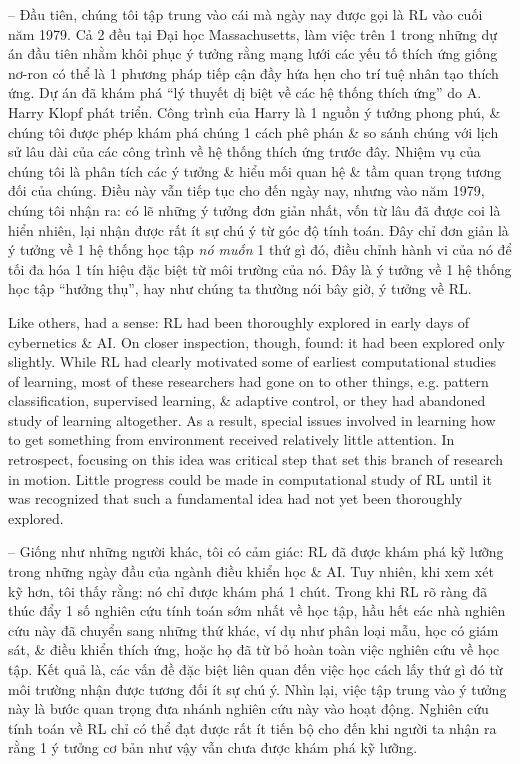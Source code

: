 \documentclass{article}
\begin{document}
\begin{itemize}
    -- Đầu tiên, chúng tôi tập trung vào cái mà ngày nay được gọi là RL vào cuối năm 1979. Cả 2 đều tại Đại học Massachusetts, làm việc trên 1 trong những dự án đầu tiên nhằm khôi phục ý tưởng rằng mạng lưới các yếu tố thích ứng giống nơ-ron có thể là 1 phương pháp tiếp cận đầy hứa hẹn cho trí tuệ nhân tạo thích ứng. Dự án đã khám phá ``lý thuyết dị biệt về các hệ thống thích ứng'' do {\sc A. Harry Klopf} phát triển. Công trình của Harry là 1 nguồn ý tưởng phong phú, \& chúng tôi được phép khám phá chúng 1 cách phê phán \& so sánh chúng với lịch sử lâu dài của các công trình về hệ thống thích ứng trước đây. Nhiệm vụ của chúng tôi là phân tích các ý tưởng \& hiểu mối quan hệ \& tầm quan trọng tương đối của chúng. Điều này vẫn tiếp tục cho đến ngày nay, nhưng vào năm 1979, chúng tôi nhận ra: có lẽ những ý tưởng đơn giản nhất, vốn từ lâu đã được coi là hiển nhiên, lại nhận được rất ít sự chú ý từ góc độ tính toán. Đây chỉ đơn giản là ý tưởng về 1 hệ thống học tập {\it nó muốn} 1 thứ gì đó, điều chỉnh hành vi của nó để tối đa hóa 1 tín hiệu đặc biệt từ môi trường của nó. Đây là ý tưởng về 1 hệ thống học tập ``hưởng thụ'', hay như chúng ta thường nói bây giờ, ý tưởng về RL.

    Like others, had a sense: RL had been thoroughly explored in early days of cybernetics \& AI. On closer inspection, though, found: it had been explored only slightly. While RL had clearly motivated some of earliest computational studies of learning, most of these researchers had gone on to other things, e.g. pattern classification, supervised learning, \& adaptive control, or they had abandoned study of learning altogether. As a result, special issues involved in learning how to get something from environment received relatively little attention. In retrospect, focusing on this idea was critical step that set this branch of research in motion. Little progress could be made in computational study of RL until it was recognized that such a fundamental idea had not yet been thoroughly explored.

    -- Giống như những người khác, tôi có cảm giác: RL đã được khám phá kỹ lưỡng trong những ngày đầu của ngành điều khiển học \& AI. Tuy nhiên, khi xem xét kỹ hơn, tôi thấy rằng: nó chỉ được khám phá 1 chút. Trong khi RL rõ ràng đã thúc đẩy 1 số nghiên cứu tính toán sớm nhất về học tập, hầu hết các nhà nghiên cứu này đã chuyển sang những thứ khác, ví dụ như phân loại mẫu, học có giám sát, \& điều khiển thích ứng, hoặc họ đã từ bỏ hoàn toàn việc nghiên cứu về học tập. Kết quả là, các vấn đề đặc biệt liên quan đến việc học cách lấy thứ gì đó từ môi trường nhận được tương đối ít sự chú ý. Nhìn lại, việc tập trung vào ý tưởng này là bước quan trọng đưa nhánh nghiên cứu này vào hoạt động. Nghiên cứu tính toán về RL chỉ có thể đạt được rất ít tiến bộ cho đến khi người ta nhận ra rằng 1 ý tưởng cơ bản như vậy vẫn chưa được khám phá kỹ lưỡng.


\end{itemize}
\end{document}
